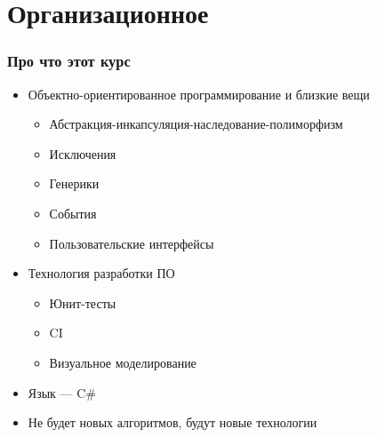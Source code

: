 \documentclass{../../slides-style}
\begin{document}
    
    \begin{frame}[plain]
        \titlepage
    \end{frame}

    \section{Организационное}

    \begin{frame}
        \frametitle{Про что этот курс}
        \begin{itemize}
            \item Объектно-ориентированное программирование и близкие вещи
            \begin{itemize}
                \item Абстракция-инкапсуляция-наследование-полиморфизм
                \item Исключения
                \item Генерики
                \item События
                \item Пользовательские интерфейсы
            \end{itemize}
            \item Технология разработки ПО
            \begin{itemize}
                \item Юнит-тесты
                \item CI
                \item Визуальное моделирование
            \end{itemize}
            \item Язык --- C\#
            \item Не будет новых алгоритмов, будут новые технологии
        \end{itemize}
    \end{frame}
\end{document}
